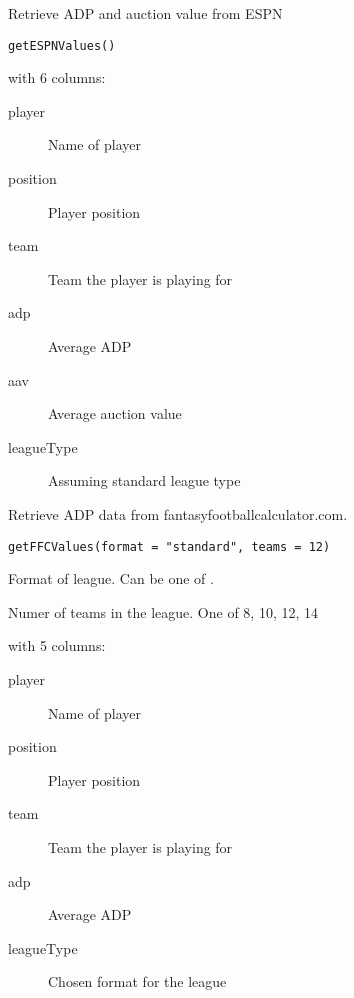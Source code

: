 \documentclass[a4paper]{book}
\begin{document}
%
\begin{Description}\relax
Retrieve ADP and auction value from ESPN
\end{Description}
%
\begin{Usage}
\begin{verbatim}
getESPNValues()
\end{verbatim}
\end{Usage}
%
\begin{Value}
 with 6 columns:
\begin{description}

\item[player] Name of player
\item[position] Player position
\item[team] Team the player is playing for
\item[adp] Average ADP
\item[aav] Average auction value
\item[leagueType] Assuming standard league type
\end{description}

\end{Value}
%
\begin{Description}\relax
Retrieve ADP data from fantasyfootballcalculator.com.
\end{Description}
%
\begin{Usage}
\begin{verbatim}
getFFCValues(format = "standard", teams = 12)
\end{verbatim}
\end{Usage}
%
\begin{Arguments}
\begin{ldescription}
\item[\code{format}] Format of league. Can be one of .

\item[\code{teams}] Numer of teams in the league. One of 8, 10, 12, 14
\end{ldescription}
\end{Arguments}
%
\begin{Value}
 with 5 columns:
\begin{description}

\item[player] Name of player
\item[position] Player position
\item[team] Team the player is playing for
\item[adp] Average ADP
\item[leagueType] Chosen format for the league
\end{description}

\end{Value}
\end{document}

